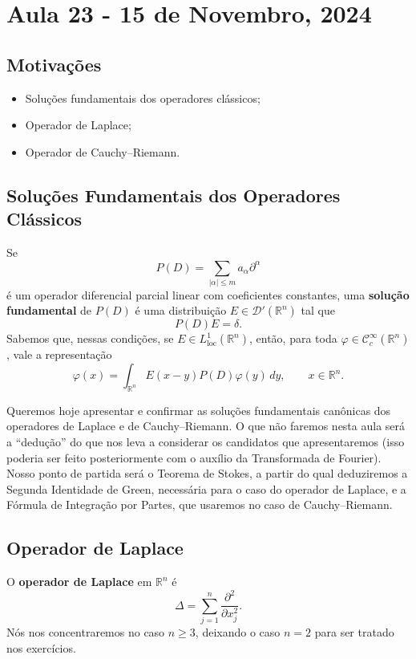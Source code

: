 \documentclass[../distribution_theory_notes.tex]{subfiles}
\begin{document}
\section{Aula 23 - 15 de Novembro, 2024}
\subsection{Motivações}
\begin{itemize}
	\item Soluções fundamentais dos operadores clássicos;
	\item Operador de Laplace;
	\item Operador de Cauchy--Riemann.
\end{itemize}

\subsection{Soluções Fundamentais dos Operadores Clássicos}
Se
\[
	P(D)=\sum\limits_{|\alpha|\leq m}a_{\alpha}\partial^{\alpha}
\]
é um operador diferencial parcial linear com coeficientes constantes, uma \textbf{solução fundamental} de \(P(D)\) é uma distribuição \(E\in\mathcal{D}'(\mathbb{R}^{n})\) tal que
\[
	P(D)E=\delta.
\]
Sabemos que, nessas condições, se \(E\in L_{\mathrm{loc}}^{1}(\mathbb{R}^{n})\), então, para toda \(\varphi\in\mathcal{C}_{c}^{\infty}(\mathbb{R}^{n})\), vale a representação
\[
	\varphi(x)=\int_{\mathbb{R}^{n}}E(x-y)P(D)\varphi(y)\,dy,
	\qquad x\in\mathbb{R}^{n}.
\]

Queremos hoje apresentar e confirmar as soluções fundamentais canônicas dos operadores de Laplace e de Cauchy--Riemann. O que não faremos nesta aula será a ``dedução'' do que nos leva a considerar os candidatos que apresentaremos (isso poderia ser feito posteriormente com o auxílio da Transformada de Fourier). Nosso ponto de partida será o Teorema de Stokes, a partir do qual deduziremos a Segunda Identidade de Green, necessária para o caso do operador de Laplace, e a Fórmula de Integração por Partes, que usaremos no caso de Cauchy--Riemann.

\subsection{Operador de Laplace}
O \textbf{operador de Laplace} em \(\mathbb{R}^{n}\) é
\[
	\Delta=\sum\limits_{j=1}^{n}\frac{\partial^{2}}{\partial x_{j}^{2}}.
\]
Nós nos concentraremos no caso \(n\geq 3\), deixando o caso \(n=2\) para ser tratado nos exercícios.
\end{document}

